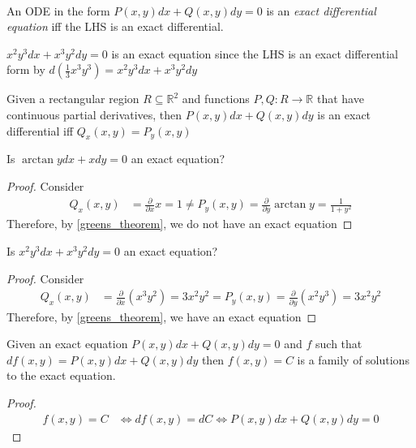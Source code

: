 \documentclass[notes.tex]{subfiles}
\begin{document}
\begin{definition} ~\par
    An ODE in the form $P(x, y)dx + Q(x, y)dy = 0$ is an \textit{exact differential equation} iff the LHS is an exact differential.
\end{definition}

\begin{example}
    $x^2 y^3 dx + x^3 y^2 dy = 0$ is an exact equation since the LHS is an exact differential form by $d\left(\frac{1}{3}x^3 y^3\right) = x^2 y^3 dx + x^3 y^2 dy$
\end{example}

\begin{theorem} \label{greens_theorem}
    Given a rectangular region $R \subseteq \mathbb{R}^2$ and functions $P, Q\colon R \to \mathbb{R}$ that have continuous partial derivatives, then $P(x, y)dx + Q(x, y)dy$ is an exact differential iff $Q_x(x, y) = P_y(x, y)$
\end{theorem}

\begin{exercise}
    Is $\arctan y dx + x dy = 0$ an exact equation?
\end{exercise}
\begin{proof}
    Consider
    \begin{align*}
        Q_x(x, y)
        &= \frac{\partial}{\partial x} x
        = 1
        \neq P_y(x, y)
        = \frac{\partial}{\partial y} \arctan y
        = \frac{1}{1 + y^2}
    \end{align*}
    Therefore, by \cref{greens_theorem}, we do not have an exact equation
\end{proof}

\begin{exercise}
    Is $x^2 y^3 dx + x^3 y^2 dy = 0$ an exact equation?
\end{exercise}
\begin{proof}
    Consider
    \begin{align*}
        Q_x(x, y)
        &= \frac{\partial}{\partial x} (x^3 y^2)
        = 3 x^2 y^2
        = P_y(x, y)
        = \frac{\partial}{\partial y} (x^2 y^3)
        = 3 x^2 y^2
    \end{align*}
    Therefore, by \cref{greens_theorem}, we have an exact equation
\end{proof}

\begin{lemma} \label{exact_eq_sol}
    Given an exact equation $P(x, y)dx + Q(x, y)dy = 0$ and $f$ such that $df(x, y) = P(x, y)dx + Q(x, y)dy$ then $f(x, y) = C$ is a family of solutions to the exact equation.
\end{lemma}
\begin{proof}
    \begin{align*}
        f(x, y) = C
        &\iff df(x, y) = dC
        \iff P(x, y)dx + Q(x, y)dy = 0
    \end{align*}
\end{proof}
\end{document}
